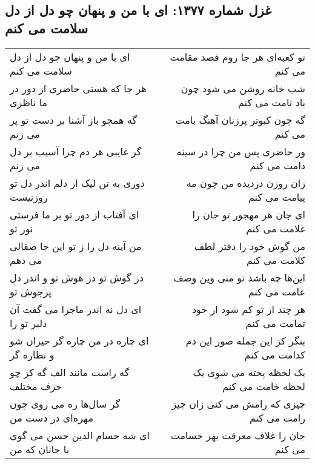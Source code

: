 \begin{center}
\section*{غزل شماره ۱۳۷۷: ای با من و پنهان چو دل از دل سلامت می کنم}
\label{sec:1377}
\begin{longtable}{l p{0.5cm} r}
ای با من و پنهان چو دل از دل سلامت می کنم
&&
تو کعبه‌ای هر جا روم قصد مقامت می کنم
\\
هر جا که هستی حاضری از دور در ما ناظری
&&
شب خانه روشن می شود چون یاد نامت می کنم
\\
گه همچو باز آشنا بر دست تو پر می زنم
&&
گه چون کبوتر پرزنان آهنگ بامت می کنم
\\
گر غایبی هر دم چرا آسیب بر دل می زنم
&&
ور حاضری پس من چرا در سینه دامت می کنم
\\
دوری به تن لیک از دلم اندر دل تو روزنیست
&&
زان روزن دزدیده من چون مه پیامت می کنم
\\
ای آفتاب از دور تو بر ما فرستی نور تو
&&
ای جان هر مهجور تو جان را غلامت می کنم
\\
من آینه دل را ز تو این جا صقالی می دهم
&&
من گوش خود را دفتر لطف کلامت می کنم
\\
در گوش تو در هوش تو و اندر دل پرجوش تو
&&
این‌ها چه باشد تو منی وین وصف عامت می کنم
\\
ای دل نه اندر ماجرا می گفت آن دلبر تو را
&&
هر چند از تو کم شود از خود تمامت می کنم
\\
ای چاره در من چاره گر حیران شو و نظاره گر
&&
بنگر کز این جمله صور این دم کدامت می کنم
\\
گه راست مانند الف گه کژ چو حرف مختلف
&&
یک لحظه پخته می شوی یک لحظه خامت می کنم
\\
گر سال‌ها ره می روی چون مهره‌ای در دست من
&&
چیزی که رامش می کنی زان چیز رامت می کنم
\\
ای شه حسام الدین حسن می گوی با جانان که من
&&
جان را غلاف معرفت بهر حسامت می کنم
\\
\end{longtable}
\end{center}
